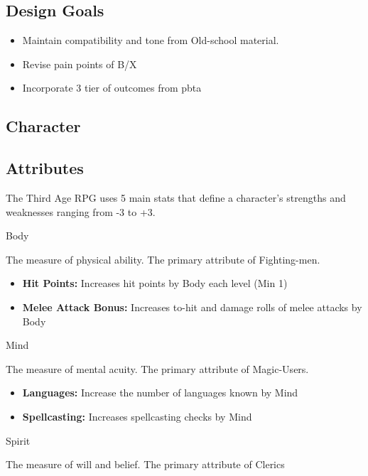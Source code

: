 \documentclass[18pt]{article}
\begin{document}
\subsection*{Design Goals}
\begin{itemize}
	\item Maintain compatibility and tone from Old-school material.
        \item Revise pain points of B/X
        \item Incorporate 3 tier of outcomes from pbta
\end{itemize}
\begin{multicols}{2}
\section*{Character}
\subsection*{Attributes}
The Third Age RPG uses 5 main stats that define a character's strengths and weaknesses ranging from -3 to +3. 

\begin{mercHeading}
Body
\end{mercHeading}
The measure of physical ability. The primary attribute of Fighting-men.

\begin{itemize}
	\setlength\itemsep{0em}
	\item \textbf{Hit Points:} Increases hit points by Body each level (Min 1)
	\item \textbf{Melee Attack Bonus:} Increases to-hit and damage rolls of melee attacks by Body
\end{itemize}

\begin{mercHeading}
Mind
\end{mercHeading}
The measure of mental acuity. The primary attribute of Magic-Users.

\begin{itemize}
\setlength\itemsep{0em}
	\item \textbf{Languages:} Increase the number of languages known by Mind
	\item \textbf{Spellcasting:} Increases spellcasting checks by Mind
\end{itemize}

\begin{mercHeading}
Spirit
\end{mercHeading}
The measure of will and belief. The primary attribute of Clerics


\end{multicols}
\end{document}
